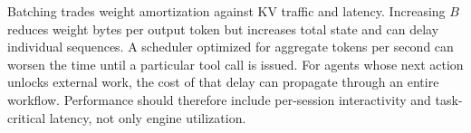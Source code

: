 Batching trades weight amortization against KV traffic and latency. Increasing $B$ reduces weight bytes per output token but increases total state and can delay individual sequences. A scheduler optimized for aggregate tokens per second can worsen the time until a particular tool call is issued. For agents whose next action unlocks external work, the cost of that delay can propagate through an entire workflow. Performance should therefore include per-session interactivity and task-critical latency, not only engine utilization.

